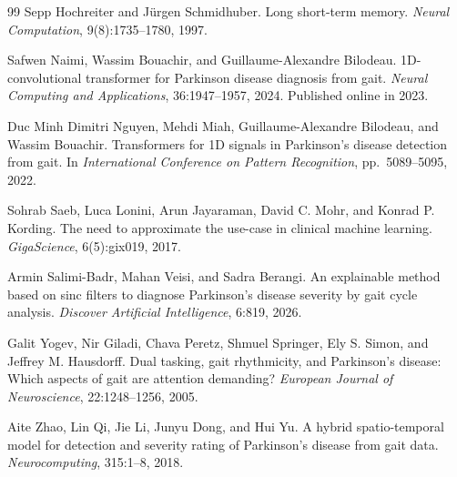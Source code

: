 \begin{thebibliography}{99}
Sepp Hochreiter and J\"urgen Schmidhuber.
Long short-term memory.
\emph{Neural Computation}, 9(8):1735--1780, 1997.

Safwen Naimi, Wassim Bouachir, and Guillaume-Alexandre Bilodeau.
1D-convolutional transformer for Parkinson disease diagnosis from gait.
\emph{Neural Computing and Applications}, 36:1947--1957, 2024. Published online in 2023.

Duc Minh Dimitri Nguyen, Mehdi Miah, Guillaume-Alexandre Bilodeau, and Wassim Bouachir.
Transformers for 1D signals in Parkinson's disease detection from gait.
In \emph{International Conference on Pattern Recognition}, pp.\ 5089--5095, 2022.

Sohrab Saeb, Luca Lonini, Arun Jayaraman, David C. Mohr, and Konrad P. Kording.
The need to approximate the use-case in clinical machine learning.
\emph{GigaScience}, 6(5):gix019, 2017.

Armin Salimi-Badr, Mahan Veisi, and Sadra Berangi.
An explainable method based on sinc filters to diagnose Parkinson's disease severity by gait cycle analysis.
\emph{Discover Artificial Intelligence}, 6:819, 2026.

Galit Yogev, Nir Giladi, Chava Peretz, Shmuel Springer, Ely S. Simon, and Jeffrey M. Hausdorff.
Dual tasking, gait rhythmicity, and Parkinson's disease: Which aspects of gait are attention demanding?
\emph{European Journal of Neuroscience}, 22:1248--1256, 2005.

Aite Zhao, Lin Qi, Jie Li, Junyu Dong, and Hui Yu.
A hybrid spatio-temporal model for detection and severity rating of Parkinson's disease from gait data.
\emph{Neurocomputing}, 315:1--8, 2018.

\end{thebibliography}

\appendix
